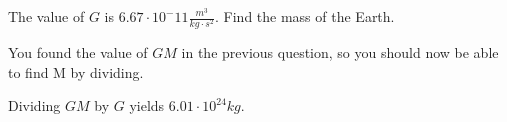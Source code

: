 \documentclass{ximera}
\begin{document}
\begin{question}
The value of $G$ is $6.67 \cdot 10^-{11} \frac{m^3}{kg \cdot s^2}$. Find the mass of the Earth.
\begin{solution}
\begin{multiple-choice}
\end{multiple-choice}
\begin{hint}
You found the value of $G M$ in the previous question, so you should now be able to find M by dividing.
\end{hint}
Dividing $G M$ by $G$ yields $6.01 \cdot 10^{24} kg$.
\end{solution}
\end{question}
\end{document}

